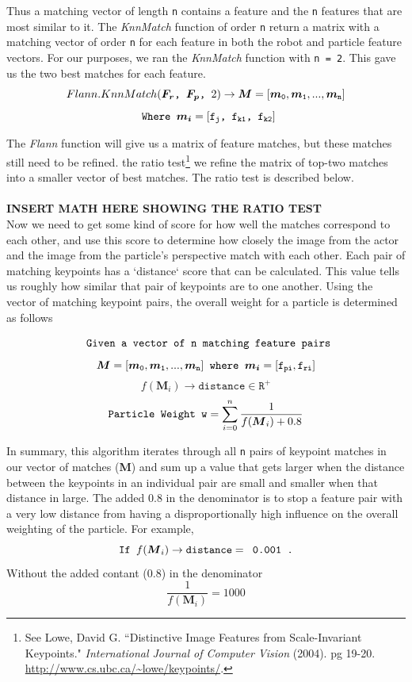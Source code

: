 \documentclass[a4paper,11pt]{article}
\begin{document}
 Thus a matching vector of length \texttt{n} contains a feature and the \texttt{n} features that are most similar to it. The \emph{KnnMatch} function of order \texttt{n} return a matrix with a matching vector of order \texttt{n} for each feature in both the robot and particle feature vectors. For our purposes, we ran the \emph{KnnMatch} function with \texttt{n = 2}. This gave us the two best matches for each feature.
 \[ Flann.KnnMatch(\boldsymbol{F_r} \verb., . \boldsymbol{F_p} \verb., . 2) \to \boldsymbol{M} = \mathtt{ [\boldsymbol{m}_0, \boldsymbol{m}_1, ... , \boldsymbol{m}_n ]} \]
 \[ \verb. Where . \boldsymbol{m_i} = \mathtt{ [f_{j}} \verb., . \mathtt{f_{k1}} \verb., . \mathtt{f_{k2}} ]\]

 The \emph{Flann} function will give us a matrix of feature matches, but these matches still need to be refined. the ratio test\footnote{See Lowe, David G. ``Distinctive Image Features from Scale-Invariant Keypoints." {\it International Journal of Computer Vision} (2004). pg 19-20.  \url{http://www.cs.ubc.ca/~lowe/keypoints/}.} we refine the matrix of top-two matches into a smaller vector of best matches. The ratio test is described below.
\\ \\
 \textbf{INSERT MATH HERE SHOWING THE RATIO TEST}
\\
  Now we need to get some kind of score for how well the matches correspond to each other, and use this score to determine how closely the image from the actor and the image from the particle's perspective match with each other. Each pair of matching keypoints has a `distance` score that can be calculated. This value tells us roughly how similar that pair of keypoints are to one another. Using the vector of matching keypoint pairs, the overall weight for a particle is determined as follows

\[  \verb. Given a vector of . \mathtt{n} \verb. matching feature pairs. \]
\[  \boldsymbol{M} = \mathtt{ [\boldsymbol{m}_0, \boldsymbol{m}_1, ... , \boldsymbol{m}_n} ]  \verb. where . \boldsymbol{m_i} = \mathtt{ \mathtt{[f_{pi}, f_{ri}]} }   \]
\[  f(\boldsymbol{M}_i) \to \mathtt{distance} \in \mathtt{R^+}   \]
\[  \verb.Particle Weight . \mathtt{w} = \sum_{i=0}^{n} \frac 1{f(\boldsymbol{M}_i) + 0.8} \]

In summary, this algorithm iterates through all \texttt{n} pairs of keypoint matches in our vector of matches (\textbf{M}) and sum up a value that gets larger when the distance between the keypoints in an individual pair are small and smaller when that distance in large. The added 0.8 in the denominator is to stop a feature pair with a very low distance from having a disproportionally high influence on the overall weighting of the particle. For example,
\[ \verb.If . f(\boldsymbol{M}_i) \to \mathtt{distance} = \verb, 0.001 ., \]
Without the added contant (0.8) in the denominator
\[ \frac 1{f(\boldsymbol{M}_i)} = 1000\]
\end{document}
